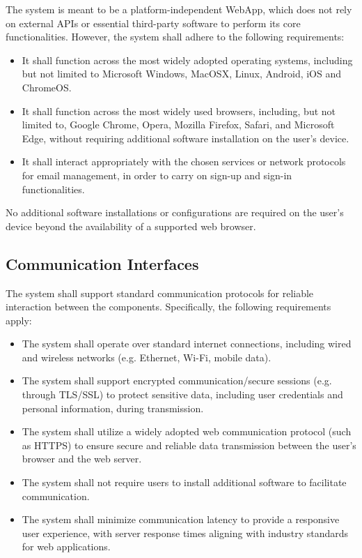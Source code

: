 The system is meant to be a platform-independent WebApp, which does not rely on external APIs or essential third-party software to perform its core functionalities. 
However, the system shall adhere to the following requirements:

\begin{itemize}
    \item It shall function across the most widely adopted operating systems, including but not limited to Microsoft Windows, MacOSX, Linux, Android, iOS and ChromeOS.
    
    \item It shall function across the most widely used browsers, including, but not limited to, Google Chrome, Opera, Mozilla Firefox, Safari, and Microsoft Edge, without requiring additional software installation on the user’s device.

    \item It shall interact appropriately with the chosen services or network protocols for email management, in order to carry on sign-up and sign-in functionalities.
\end{itemize}

No additional software installations or configurations are required on the user's device beyond the availability of a supported web browser.

\subsection{Communication Interfaces}
\label{subsec:communication_interfaces}

The system shall support standard communication protocols for reliable interaction between the components. Specifically, the following requirements apply:

\begin{itemize}
    \item The system shall operate over standard internet connections, including wired and wireless networks (e.g. Ethernet, Wi-Fi, mobile data).

    \item The system shall support encrypted communication/secure sessions (e.g. through TLS/SSL) to protect sensitive data, including user credentials and personal information, during transmission.

    \item The system shall utilize a widely adopted web communication protocol (such as HTTPS) to ensure secure and reliable data transmission between the user's browser and the web server.

    \item The system shall not require users to install additional software to facilitate communication.

    \item The system shall minimize communication latency to provide a responsive user experience, with server response times aligning with industry standards for web applications.
\end{itemize}

